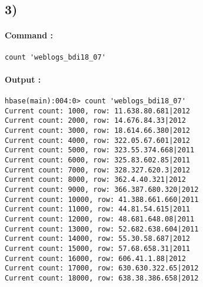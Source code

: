 \documentclass[a4paper,11pt]{report}
\begin{document}
\subsection*{3)}

\paragraph{Command : } \verb+count 'weblogs_bdi18_07'+

\paragraph{Output : }

\begin{verbatim}
hbase(main):004:0> count 'weblogs_bdi18_07'
Current count: 1000, row: 11.638.80.681|2012                                                            
Current count: 2000, row: 14.676.84.33|2012                                                             
Current count: 3000, row: 18.614.66.380|2012                                                            
Current count: 4000, row: 322.05.67.601|2012                                                            
Current count: 5000, row: 323.55.374.668|2011                                                           
Current count: 6000, row: 325.83.602.85|2011                                                            
Current count: 7000, row: 328.327.620.3|2012                                                            
Current count: 8000, row: 362.4.40.321|2012                                                             
Current count: 9000, row: 366.387.680.320|2012                                                          
Current count: 10000, row: 41.388.661.660|2011                                                          
Current count: 11000, row: 44.81.54.615|2011                                                            
Current count: 12000, row: 48.681.648.08|2011                                                           
Current count: 13000, row: 52.682.638.604|2011                                                          
Current count: 14000, row: 55.30.58.687|2012                                                            
Current count: 15000, row: 57.68.658.31|2011                                                            
Current count: 16000, row: 606.41.1.88|2012                                                             
Current count: 17000, row: 630.630.322.65|2012                                                          
Current count: 18000, row: 638.38.386.658|2012                                                          

\end{verbatim}
\end{document}
